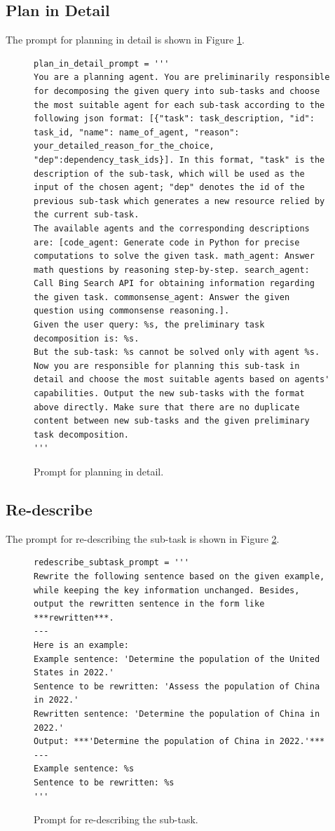 \subsection{Plan in Detail}
\label{app_plan_in_detail}
The prompt for planning in detail is shown in Figure \ref{planindetail}.
\begin{figure}[H]
\centering
\begin{lstlisting}[frame=single, basicstyle=\scriptsize\ttfamily, breaklines=true]
plan_in_detail_prompt = '''
You are a planning agent. You are preliminarily responsible for decomposing the given query into sub-tasks and choose the most suitable agent for each sub-task according to the following json format: [{"task": task_description, "id": task_id, "name": name_of_agent, "reason": your_detailed_reason_for_the_choice, "dep":dependency_task_ids}]. In this format, "task" is the description of the sub-task, which will be used as the input of the chosen agent; "dep" denotes the id of the previous sub-task which generates a new resource relied by the current sub-task. 
The available agents and the corresponding descriptions are: [code_agent: Generate code in Python for precise computations to solve the given task. math_agent: Answer math questions by reasoning step-by-step. search_agent: Call Bing Search API for obtaining information regarding the given task. commonsense_agent: Answer the given question using commonsense reasoning.]. 
Given the user query: %s, the preliminary task decomposition is: %s.
But the sub-task: %s cannot be solved only with agent %s. Now you are responsible for planning this sub-task in detail and choose the most suitable agents based on agents' capabilities. Output the new sub-tasks with the format above directly. Make sure that there are no duplicate content between new sub-tasks and the given preliminary task decomposition.
'''
\end{lstlisting}
\caption{Prompt for planning in detail.}
\label{planindetail}
\end{figure}

\subsection{Re-describe}
\label{app_redescribe}
The prompt for re-describing the sub-task is shown in Figure \ref{redescribe}.
\begin{figure}[H]
\centering
\begin{lstlisting}[frame=single, basicstyle=\scriptsize\ttfamily, breaklines=true]
redescribe_subtask_prompt = '''
Rewrite the following sentence based on the given example, while keeping the key information unchanged. Besides, output the rewritten sentence in the form like ***rewritten***.
---
Here is an example:
Example sentence: 'Determine the population of the United States in 2022.'
Sentence to be rewritten: 'Assess the population of China in 2022.'
Rewritten sentence: 'Determine the population of China in 2022.'
Output: ***'Determine the population of China in 2022.'***
---
Example sentence: %s
Sentence to be rewritten: %s
'''
\end{lstlisting}
\caption{Prompt for re-describing the sub-task.}
\label{redescribe}
\end{figure}

